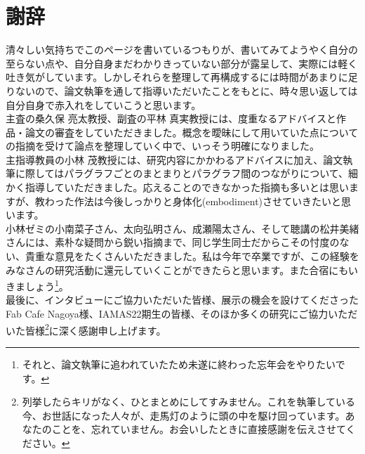 \chapter*{謝辞}
清々しい気持ちでこのページを書いているつもりが、書いてみてようやく自分の至らない点や、自分自身まだわかりきっていない部分が露呈して、実際には軽く吐き気がしています。しかしそれらを整理して再構成するには時間があまりに足りないので、論文執筆を通して指導いただいたことをもとに、時々思い返しては自分自身で赤入れをしていこうと思います。\\
主査の桑久保 亮太教授、副査の平林 真実教授には、度重なるアドバイスと作品・論文の審査をしていただきました。概念を曖昧にして用いていた点についての指摘を受けて論点を整理していく中で、いっそう明確になりました。\\
主指導教員の小林 茂教授には、研究内容にかかわるアドバイスに加え、論文執筆に際してはパラグラフごとのまとまりとパラグラフ間のつながりについて、細かく指導していただきました。応えることのできなかった指摘も多いとは思いますが、教わった作法は今後しっかりと身体化(embodiment)させていきたいと思います。\\
小林ゼミの小南菜子さん、太向弘明さん、成瀬陽太さん、そして聴講の松井美緒さんには、素朴な疑問から鋭い指摘まで、同じ学生同士だからこその忖度のない、貴重な意見をたくさんいただきました。私は今年で卒業ですが、この経験をみなさんの研究活動に還元していくことができたらと思います。また合宿にもいきましょう\footnote{それと、論文執筆に追われていたため未遂に終わった忘年会をやりたいです。}。\\
最後に、インタビューにご協力いただいた皆様、展示の機会を設けてくださったFab Cafe Nagoya様、IAMAS22期生の皆様、そのほか多くの研究にご協力いただいた皆様\footnote{列挙したらキリがなく、ひとまとめにしてすみません。これを執筆している今、お世話になった人々が、走馬灯のように頭の中を駆け回っています。あなたのことを、忘れていません。お会いしたときに直接感謝を伝えさせてください。}に深く感謝申し上げます。


